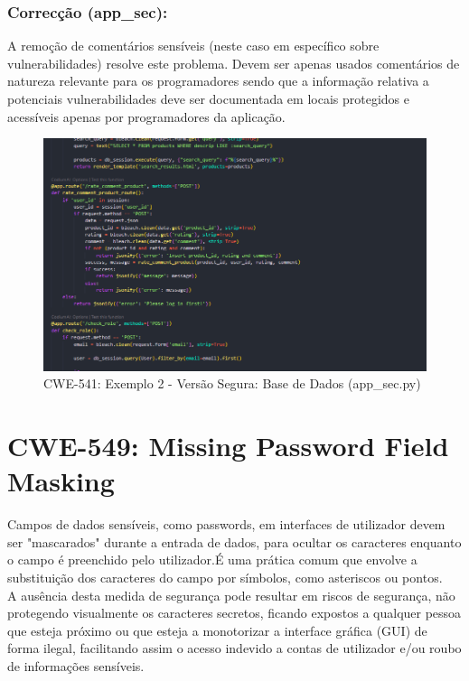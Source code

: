 \subsubsection{Correcção (app\_sec):}
A remoção de comentários sensíveis (neste caso em específico sobre vulnerabilidades) resolve este problema. Devem ser apenas usados comentários de natureza relevante para os programadores sendo que a informação relativa a potenciais vulnerabilidades deve ser documentada em locais protegidos e acessíveis apenas por programadores da aplicação. 

\begin{figure}[H]
  \centering
  \includegraphics[width=16cm]{images/CWE-541-EX2.png}
  \caption{CWE-541: Exemplo 2 - Versão Segura: Base de Dados (app\_sec.py)}
  \label{fig:cwe541-ex2}
\end{figure}
%
%
\section{CWE-549: Missing Password Field Masking}
\label{sec.cwe549}
Campos de dados sensíveis, como passwords, em interfaces de utilizador devem ser "mascarados" durante a entrada de dados, para ocultar os caracteres enquanto o campo é preenchido pelo utilizador.É uma prática comum que envolve a substituição dos caracteres do campo por símbolos, como asteriscos ou pontos. \\ 
A ausência desta medida de segurança pode resultar em riscos de segurança, não protegendo visualmente os caracteres secretos, ficando expostos a qualquer pessoa que esteja próximo ou que esteja a monotorizar a interface gráfica (GUI) de forma ilegal, facilitando assim o acesso indevido a contas de utilizador e/ou roubo de informações sensíveis. \\

